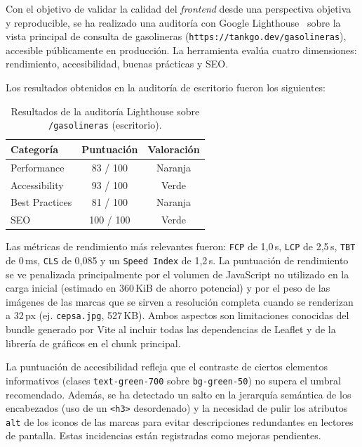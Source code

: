 Con el objetivo de validar la calidad del \textit{frontend} desde una perspectiva objetiva y
reproducible, se ha realizado una auditoría con Google Lighthouse~\cite{lighthouse} sobre la vista
principal de consulta de gasolineras (\texttt{https://tankgo.dev/gasolineras}), accesible
públicamente en producción. La herramienta evalúa cuatro dimensiones: rendimiento,
accesibilidad, buenas prácticas y SEO.

Los resultados obtenidos en la auditoría de escritorio fueron los siguientes:

\begin{table}[H]
  \centering
  \begin{tabular}{lcc}
    \hline
    \textbf{Categoría} & \textbf{Puntuación} & \textbf{Valoración} \\
    \hline
    Performance        & 83 / 100            & Naranja             \\
    Accessibility      & 93 / 100            & Verde               \\
    Best Practices     & 81 / 100            & Naranja             \\
    SEO                & 100 / 100           & Verde               \\
    \hline
  \end{tabular}
  \caption{Resultados de la auditoría Lighthouse sobre \texttt{/gasolineras} (escritorio).}
  \label{tab:lighthouse}
\end{table}

Las métricas de rendimiento más relevantes fueron: \texttt{FCP} de 1,0\,s, \texttt{LCP}
de 2,5\,s, \texttt{TBT} de 0\,ms, \texttt{CLS} de 0,085 y un \texttt{Speed Index} de 1,2\,s. La puntuación de rendimiento se ve penalizada
principalmente por el volumen de JavaScript no utilizado en la carga inicial (estimado en
360\,KiB de ahorro potencial) y por el peso de las imágenes de las marcas que se sirven a resolución
completa cuando se renderizan a 32\,px (ej. \texttt{cepsa.jpg}, 527\,KB). Ambos aspectos son
limitaciones conocidas del bundle generado por Vite al incluir todas las dependencias de Leaflet
y de la librería de gráficos en el chunk principal.

La puntuación de accesibilidad refleja que el contraste de ciertos elementos informativos
(clases \texttt{text-green-700} sobre \texttt{bg-green-50}) no supera el umbral recomendado. Además, se ha detectado un salto en la
jerarquía semántica de los encabezados (uso de un \texttt{<h3>} desordenado) y la necesidad de pulir los atributos \texttt{alt}
de los iconos de las marcas para evitar descripciones redundantes en lectores de pantalla. Estas incidencias están
registradas como mejoras pendientes.

